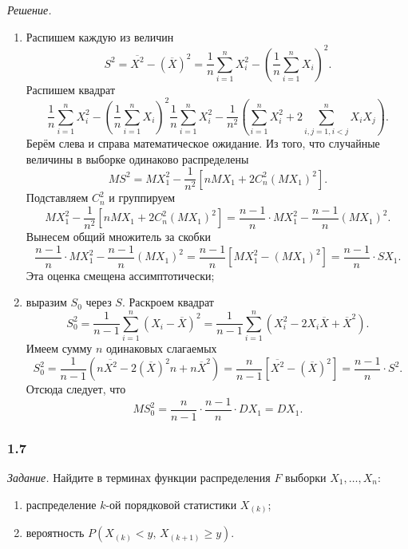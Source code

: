 \textit{Решение.}
\begin{enumerate}[label=\alph*)]
  \item Распишем каждую из величин
  $$S^2 =
    \overline{X^2} - \left( \overline{X} \right)^2 =
    \frac{1}{n} \sum \limits_{i = 1}^n X_i^2 -
    \left( \frac{1}{n} \sum \limits_{i = 1}^n X_i \right)^2.$$
  Распишем квадрат
  $$ \frac{1}{n} \sum \limits_{i = 1}^n X_i^2 -
    \left( \frac{1}{n} \sum \limits_{i = 1}^n X_i \right)^2
    \frac{1}{n} \sum \limits_{i = 1}^n X_i^2 -
    \frac{1}{n^2} \left(
      \sum \limits_{i = 1}^n X_i^2 + 2 \sum \limits_{i, j = 1, i < j}^n X_i X_j
    \right).$$
  Берём слева и справа математическое ожидание.
  Из того, что случайные величины в выборке одинаково распределены
  $$MS^2 =
    MX_1^2 - \frac{1}{n^2} \left[ nMX_1 + 2C_n^2 \left( MX_1 \right)^2 \right].$$
  Подставляем $C_n^2$ и группируем
  $$MX_1^2 - \frac{1}{n^2} \left[ nMX_1 + 2C_n^2 \left( MX_1 \right)^2 \right] =
    \frac{n - 1}{n} \cdot MX_1^2 - \frac{n - 1}{n} \left( MX_1 \right)^2.$$
  Вынесем общий множитель за скобки
  $$ \frac{n - 1}{n} \cdot MX_1^2 - \frac{n - 1}{n} \left( MX_1 \right)^2 =
    \frac{n - 1}{n} \left[ MX_1^2 - \left( MX_1 \right)^2 \right] =
    \frac{n - 1}{n} \cdot SX_1.$$
  Эта оценка смещена ассимптотически;
  \item выразим $S_0$ через $S$.
  Раскроем квадрат
  $$S_0^2 =
    \frac{1}{n - 1} \sum \limits_{i = 1}^n \left( X_i - \overline{X} \right)^2 =
    \frac{1}{n - 1}
    \sum \limits_{i = 1}^n \left( X_i^2 - 2X_i \overline{X} + \overline{X}^2 \right).$$
  Имеем сумму $n$ одинаковых слагаемых
  $$ S_0^2 =
    \frac{1}{n - 1}
    \left( n \overline{X^2} - 2 \left( \overline{X} \right)^2 n + n \overline{X}^2 \right) =
    \frac{n}{n - 1} \left[ \overline{X^2} - \left( \overline{X} \right)^2 \right] =
    \frac{n - 1}{n} \cdot S^2.$$
  Отсюда следует, что
  $$MS_0^2 =
    \frac{n}{n - 1} \cdot \frac{n - 1}{n} \cdot DX_1 =
    DX_1.$$
\end{enumerate}

\subsubsection*{1.7}

\textit{Задание.} Найдите в терминах функции распределения $F$ выборки $X_1, \dotsc, X_n$:
\begin{enumerate}[label=\alph*)]
  \item распределение $k$-ой порядковой статистики $X_{ \left( k \right) }$;
  \item вероятность
  $P \left( X_{ \left( k \right) } < y, \, X_{ \left( k + 1 \right) } \geq y \right) $.
\end{enumerate}

